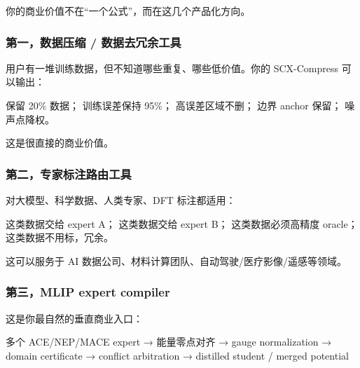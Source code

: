 \documentclass[
  12pt,
]{ctexart}
\newenvironment{Shaded}{}{}
\newcommand{\NormalTok}[1]{#1}
\begin{document}
你的商业价值不在``一个公式''，而在这几个产品化方向。

\subsubsection{第一，数据压缩 /
数据去冗余工具}\label{ux7b2cux4e00ux6570ux636eux538bux7f29-ux6570ux636eux53bbux5197ux4f59ux5de5ux5177}

用户有一堆训练数据，但不知道哪些重复、哪些低价值。你的 SCX-Compress
可以输出：

\begin{Shaded}
\begin{Highlighting}[]
\NormalTok{保留 20\% 数据；}
\NormalTok{训练误差保持 95\%；}
\NormalTok{高误差区域不删；}
\NormalTok{边界 anchor 保留；}
\NormalTok{噪声点降权。}
\end{Highlighting}
\end{Shaded}

这是很直接的商业价值。

\subsubsection{第二，专家标注路由工具}\label{ux7b2cux4e8cux4e13ux5bb6ux6807ux6ce8ux8defux7531ux5de5ux5177}

对大模型、科学数据、人类专家、DFT 标注都适用：

\begin{Shaded}
\begin{Highlighting}[]
\NormalTok{这类数据交给 expert A；}
\NormalTok{这类数据交给 expert B；}
\NormalTok{这类数据必须高精度 oracle；}
\NormalTok{这类数据不用标，冗余。}
\end{Highlighting}
\end{Shaded}

这可以服务于 AI 数据公司、材料计算团队、自动驾驶/医疗影像/遥感等领域。

\subsubsection{第三，MLIP expert
compiler}\label{ux7b2cux4e09mlip-expert-compiler}

这是你最自然的垂直商业入口：

\begin{Shaded}
\begin{Highlighting}[]
\NormalTok{多个 ACE/NEP/MACE expert}
\NormalTok{→ 能量零点对齐}
\NormalTok{→ gauge normalization}
\NormalTok{→ domain certificate}
\NormalTok{→ conflict arbitration}
\NormalTok{→ distilled student / merged potential}
\end{Highlighting}
\end{Shaded}
\end{document}
